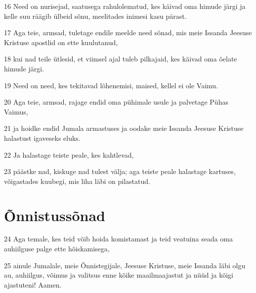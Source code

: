 \par 16 Need on nurisejad, saatusega rahulolematud, kes käivad oma himude järgi ja kelle suu räägib ülbeid sõnu, meelitades inimesi kasu pärast.
\par 17 Aga teie, armsad, tuletage endile meelde need sõnad, mis meie Issanda Jeesuse Kristuse apostlid on ette kuulutanud,
\par 18 kui nad teile ütlesid, et viimsel ajal tuleb pilkajaid, kes käivad oma õelate himude järgi.
\par 19 Need on need, kes tekitavad lõhenemisi, maised, kellel ei ole Vaimu.
\par 20 Aga teie, armsad, rajage endid oma pühimale usule ja palvetage Pühas Vaimus,
\par 21 ja hoidke endid Jumala armastuses ja oodake meie Issanda Jeesuse Kristuse halastust igaveseks eluks.
\par 22 Ja halastage teiste peale, kes kahtlevad,
\par 23 päästke nad, kiskuge nad tulest välja; aga teiste peale halastage kartuses, võigastades kuubegi, mis liha läbi on pilastatud.

\section*{Õnnistussõnad}

\par 24 Aga temale, kes teid võib hoida komistamast ja teid veatuina seada oma auhiilguse palge ette hõiskamisega,
\par 25 ainule Jumalale, meie Õnnistegijale, Jeesuse Kristuse, meie Issanda läbi olgu au, auhiilgus, võimus ja valitsus enne kõike maailmaajastut ja nüüd ja kõigi ajastuteni! Aamen.




